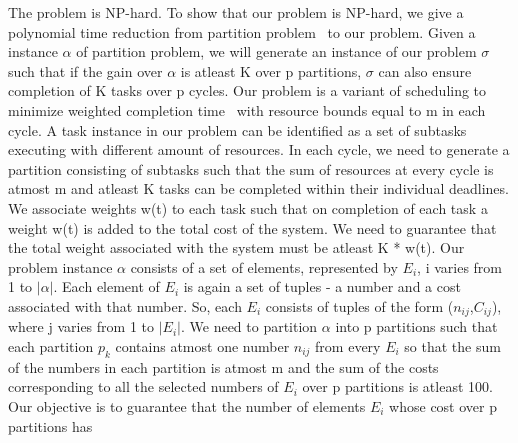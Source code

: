 % 
 The problem is NP-hard.
 To show that our problem is NP-hard, we give a polynomial time reduction from partition problem~\cite{wiki:xxx7} to our 
 problem.
 Given a instance $\alpha$ of partition problem, we will generate an instance of our problem $\sigma$ such that if the gain 
 over $\alpha$ is atleast K over p partitions, $\sigma$ can also ensure completion of K tasks over p cycles.
 Our problem is a variant of scheduling to minimize weighted completion time~\cite{garey2002computers} with resource bounds 
 equal to m in each cycle. A task instance in our problem can be identified as a set of subtasks executing with different 
 amount of resources. In each cycle, we need to generate a partition consisting of subtasks such that the sum of resources at 
 every cycle is atmost m and atleast K tasks can be completed within their individual deadlines. We associate weights w(t) to 
 each task such that on completion of each task a weight w(t) is added to the total cost of the system. We need to guarantee 
 that the total weight associated with the system must be atleast K * w(t). 
 \newline
 \newline
 Our problem instance $\alpha$ consists of a set of elements, represented by $E_{i}$, i varies from 1 to $|\alpha|$. 
Each element of $E_{i}$ is again a set of tuples - a number and a cost associated with that number. So, each $E_{i}$ consists 
 of tuples of the form ($n_{ij}$,$C_{ij}$), where j varies from 1 to $|E_{i}|$. We need to partition $\alpha$ into 
 p partitions such that each partition $p_{k}$ contains atmost one number $n_{ij}$ from every $E_{i}$ so that the sum of the 
 numbers in each partition is atmost m and the sum of the costs corresponding to all the selected numbers of $E_{i}$ over p 
 partitions is atleast 100. Our objective is to guarantee that the number of elements $E_{i}$ whose cost over p partitions has 
